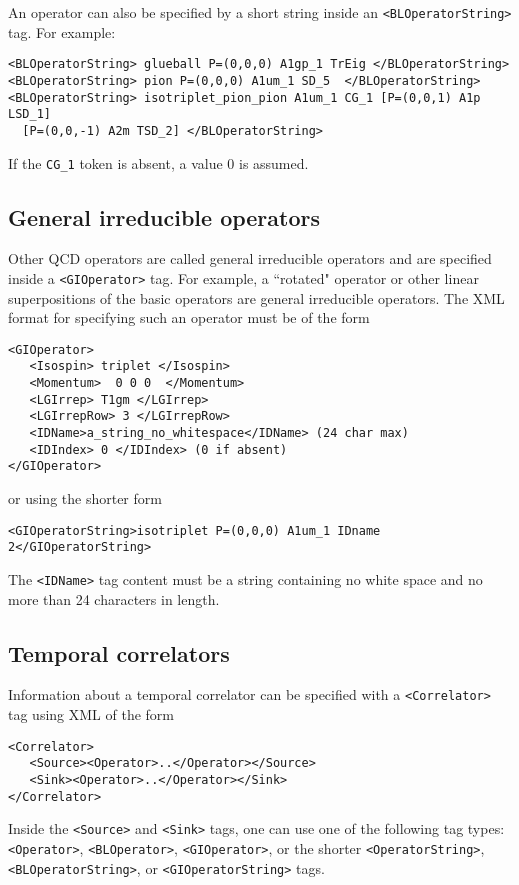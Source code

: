 \documentclass[12pt]{article}
\newcommand{\vb}{\texttt}
\begin{document}
An operator can also be specified by a short string inside an 
\vb{<BLOperatorString>} tag.  For example:                                                       
\begin{verbatim}
<BLOperatorString> glueball P=(0,0,0) A1gp_1 TrEig </BLOperatorString>                        
<BLOperatorString> pion P=(0,0,0) A1um_1 SD_5  </BLOperatorString>                            
<BLOperatorString> isotriplet_pion_pion A1um_1 CG_1 [P=(0,0,1) A1p LSD_1] 
  [P=(0,0,-1) A2m TSD_2] </BLOperatorString>   
\end{verbatim}                                                              
If the \vb{CG\_1} token is absent, a value 0 is assumed.          

\subsection{General irreducible operators}

Other QCD operators are called general irreducible operators
and are specified inside a \vb{<GIOperator>} tag. For example,
a ``rotated" operator or other linear superpositions of the 
basic operators are general irreducible operators.  The XML
format for specifying such an operator must be of the form
\begin{verbatim}
<GIOperator> 
   <Isospin> triplet </Isospin>
   <Momentum>  0 0 0  </Momentum> 
   <LGIrrep> T1gm </LGIrrep> 
   <LGIrrepRow> 3 </LGIrrepRow> 
   <IDName>a_string_no_whitespace</IDName> (24 char max)
   <IDIndex> 0 </IDIndex> (0 if absent)
</GIOperator>
\end{verbatim}
or using the shorter form
\begin{verbatim}
<GIOperatorString>isotriplet P=(0,0,0) A1um_1 IDname 2</GIOperatorString> 
\end{verbatim}
The \vb{<IDName>} tag content must be a string containing no white space
and no more than 24 characters in length.  


\subsection{Temporal correlators}

Information about a temporal correlator can be specified with a
\vb{<Correlator>} tag using XML of the form
\begin{verbatim}
<Correlator>
   <Source><Operator>..</Operator></Source>
   <Sink><Operator>..</Operator></Sink>
</Correlator>
\end{verbatim}
Inside the \vb{<Source>} and \vb{<Sink>} tags, one can use one of
the following tag types:
\vb{<Operator>}, \vb{<BLOperator>}, \vb{<GIOperator>}, or the shorter
\vb{<OperatorString>}, \vb{<BLOperatorString>}, or
\vb{<GIOperatorString>} tags.
\end{document}
